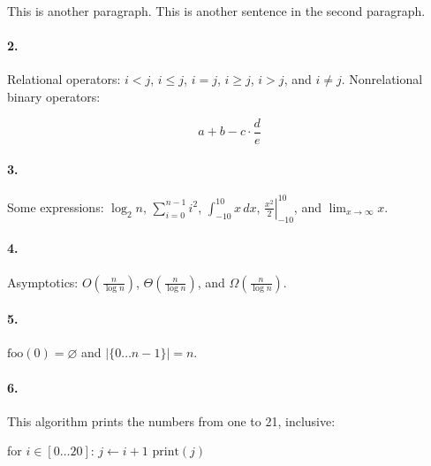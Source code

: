 This is another paragraph.
This is another sentence in the second paragraph.

\paragraph{2.} Relational operators: \(i<j\), \(i\le j\), \(i=j\), \(i\ge j\),
\(i>j\), and \(i\ne j\).  Nonrelational binary operators:

\[a+b-c\cdot\frac{d}{e}\]

\paragraph{3.} Some expressions: \(\log_2 n\), \(\sum_{i=0}^{n-1}i^2\),
\(\int_{-10}^{10}x\,dx\), \(\left.\frac{x^2}{2}\right\rvert_{-10}^{10}\), and
\(\lim_{x\to\infty}x\).

\paragraph{4.} Asymptotics: \(O\left(\frac{n}{\log n}\right)\),
\(\Theta\left(\frac{n}{\log n}\right)\), and
\(\Omega\left(\frac{n}{\log n}\right)\).

\paragraph{5.} \(\text{foo}(0)=\varnothing\) and
\(\left\lvert\{0\ldots n-1\}\right\rvert=n\).

\paragraph{6.} This algorithm prints the numbers from one to 21, inclusive:

\begin{pseudocode}
  for \(i\in[0\ldots 20]\):
    \(j\gets i+1\)
    \(\text{print}(j)\)
\end{pseudocode}


